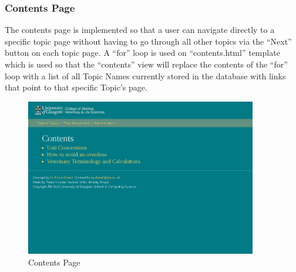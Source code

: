 \documentclass{l3proj}
\begin{document}
{\subsubsection{Contents Page}
The contents page is implemented so that a user can navigate directly to a specific topic page without having to go through all other topics via the “Next” button on each topic page. A “for” loop is used on “contents.html” template which is used so that the “contents” view will replace the contents of the “for” loop with a list of all Topic Names currently stored in the database with links that point to that specific Topic’s page.
\begin{figure}[!htb]
\caption{Contents Page}
 \centering
\includegraphics[width=0.9\textwidth]{images/contentsPage.png}
\end{figure}

}
\end{document}
